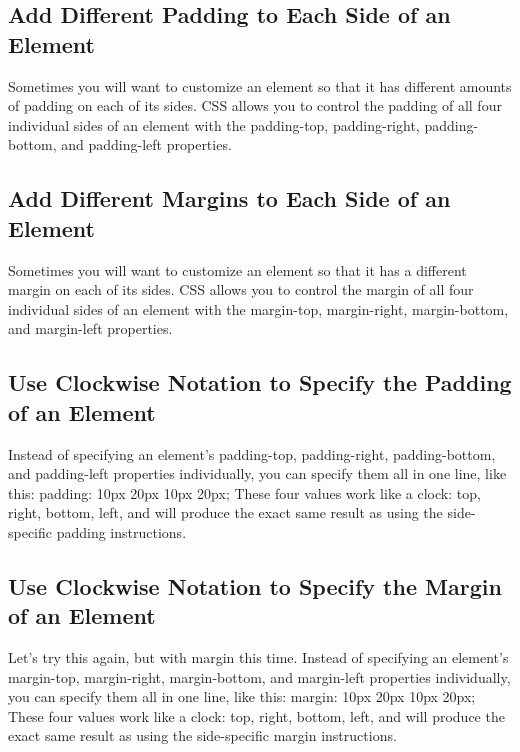 \documentclass{article}%
\begin{document}
%
\subsection{Add Different Padding to Each Side of an Element}%
\label{subsec:AddDifferentPaddingtoEachSideofanElement}%
Sometimes you will want to customize an element so that it has different amounts of padding on each of its sides.\newline%
CSS allows you to control the padding of all four individual sides of an element with the padding{-}top, padding{-}right, padding{-}bottom, and padding{-}left properties.\newline%

%
\subsection{Add Different Margins to Each Side of an Element}%
\label{subsec:AddDifferentMarginstoEachSideofanElement}%
Sometimes you will want to customize an element so that it has a different margin on each of its sides.\newline%
CSS allows you to control the margin of all four individual sides of an element with the margin{-}top, margin{-}right, margin{-}bottom, and margin{-}left properties.\newline%

%
\subsection{Use Clockwise Notation to Specify the Padding of an Element}%
\label{subsec:UseClockwiseNotationtoSpecifythePaddingofanElement}%
Instead of specifying an element's padding{-}top, padding{-}right, padding{-}bottom, and padding{-}left properties individually, you can specify them all in one line, like this:\newline%
padding: 10px 20px 10px 20px;\newline%
These four values work like a clock: top, right, bottom, left, and will produce the exact same result as using the side{-}specific padding instructions.\newline%

%
\subsection{Use Clockwise Notation to Specify the Margin of an Element}%
\label{subsec:UseClockwiseNotationtoSpecifytheMarginofanElement}%
Let's try this again, but with margin this time.\newline%
Instead of specifying an element's margin{-}top, margin{-}right, margin{-}bottom, and margin{-}left properties individually, you can specify them all in one line, like this:\newline%
margin: 10px 20px 10px 20px;\newline%
These four values work like a clock: top, right, bottom, left, and will produce the exact same result as using the side{-}specific margin instructions.\newline%
\end{document}
